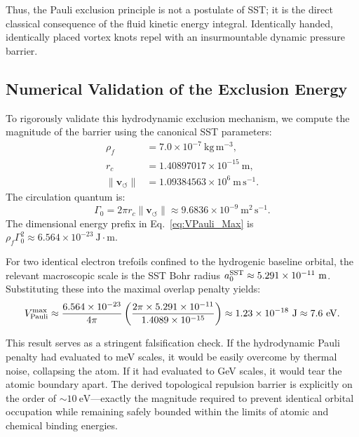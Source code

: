 \documentclass[10pt]{article}
\begin{document}
        Thus, the Pauli exclusion principle is not a postulate of SST; it is the direct classical consequence of the fluid kinetic energy integral. Identically handed, identically placed vortex knots repel with an insurmountable dynamic pressure barrier.
    
    \subsection{Numerical Validation of the Exclusion Energy}
        To rigorously validate this hydrodynamic exclusion mechanism, we compute the magnitude of the barrier using the canonical SST parameters:
        \begin{align}
            \rho_{\!f} &= 7.0 \times 10^{-7}\ \mathrm{kg\,m^{-3}}, \\
            r_c &= 1.40897017 \times 10^{-15}\ \mathrm{m}, \\
            \lVert\mathbf{v}_{\!\boldsymbol{\circlearrowleft}}\rVert &= 1.09384563 \times 10^6\ \mathrm{m\,s^{-1}}.
        \end{align}
        The circulation quantum is:
        \begin{equation}
            \Gamma_0 = 2\pi r_c \lVert\mathbf{v}_{\!\boldsymbol{\circlearrowleft}}\rVert \approx 9.6836 \times 10^{-9}\ \mathrm{m^2\,s^{-1}}.
        \end{equation}
        The dimensional energy prefix in Eq.~\eqref{eq:VPauli_Max} is $\rho_{\!f} \Gamma_0^2 \approx 6.564 \times 10^{-23}\ \mathrm{J \cdot m}$.
        
        For two identical electron trefoils confined to the hydrogenic baseline orbital, the relevant macroscopic scale is the SST Bohr radius $a_0^{\rm SST} \approx 5.291 \times 10^{-11}\ \mathrm{m}$. Substituting these into the maximal overlap penalty yields:
        \begin{equation}
            \label{eq:VPauli_Num}
            V_{\rm Pauli}^{\rm max} \approx \frac{6.564 \times 10^{-23}}{4\pi} \left( \frac{2\pi \times 5.291 \times 10^{-11}}{1.4089 \times 10^{-15}} \right) \approx 1.23 \times 10^{-18}\ \mathrm{J} \approx 7.6\ \mathrm{eV}.
        \end{equation}
        
        This result serves as a stringent falsification check. If the hydrodynamic Pauli penalty had evaluated to meV scales, it would be easily overcome by thermal noise, collapsing the atom. If it had evaluated to GeV scales, it would tear the atomic boundary apart. The derived topological repulsion barrier is explicitly on the order of $\sim 10\ \mathrm{eV}$—exactly the magnitude required to prevent identical orbital occupation while remaining safely bounded within the limits of atomic and chemical binding energies.
        
\end{document}
